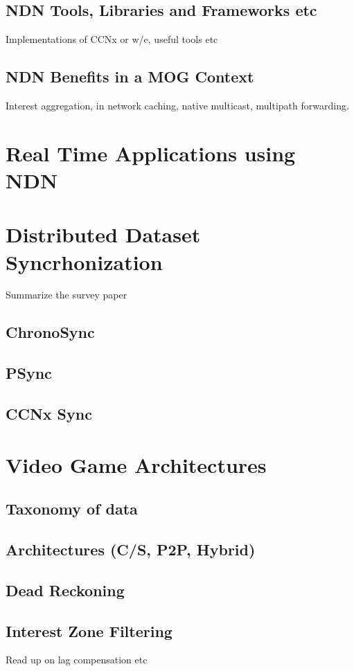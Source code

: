 \subsection{NDN Tools, Libraries and Frameworks etc}
Implementations of CCNx or w/e, useful tools etc

\subsection{NDN Benefits in a MOG Context}
Interest aggregation, in network caching, native multicast, multipath forwarding.


\section{Real Time Applications using NDN}

\section{Distributed Dataset Syncrhonization}
Summarize the survey paper
\subsection{ChronoSync}
\subsection{PSync}
\subsection{CCNx Sync}

\section{Video Game Architectures}
\subsection{Taxonomy of data}
\subsection{Architectures (C/S, P2P, Hybrid)}
\subsection{Dead Reckoning}
\subsection{Interest Zone Filtering}

Read up on lag compensation etc


